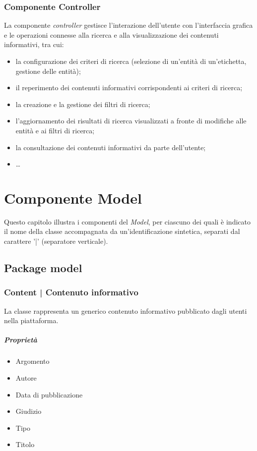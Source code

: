 \documentclass[10pt,a4paper,headinclude,footinclude,hidelinks]{scrreprt} %
\begin{document}
	\subsection{Componente Controller}
	\label{sec:stage:design:mvc:controller}
	La componente \textit{controller} gestisce l'interazione dell'utente con l'interfaccia grafica e le operazioni connesse alla ricerca e alla visualizzazione dei contenuti informativi, tra cui:
	\begin{itemize}
	\item la configurazione dei criteri di ricerca (selezione di un'entità di un'etichetta, gestione delle entità);
	\item il reperimento dei contenuti informativi corrispondenti ai criteri di ricerca;
	\item la creazione e la gestione dei filtri di ricerca;
	\item l'aggiornamento dei risultati di ricerca visualizzati a fronte di modifiche alle entità e ai filtri di ricerca;
	\item la consultazione dei contenuti informativi da parte dell'utente;
	\item \ldots
	\end{itemize}

	\chapter{Componente Model}
	\label{ch:stage:design:model}
	Questo capitolo illustra i componenti del \textit{Model}, per ciascuno dei quali è indicato il nome della classe accompagnata da un'identificazione sintetica, separati dal carattere '|' (separatore verticale).

	\section{Package model}
	\label{sec:stage:design:sistema:model}

	\subsection[Content]{Content | Contenuto informativo}
	\label{sec:stage:design:sistema:model:content}
	La classe rappresenta un generico contenuto informativo pubblicato dagli utenti nella piattaforma.

	\paragraph{Propriet\`a}
	\begin{itemize}
	\item Argomento
	\item Autore
	\item Data di pubblicazione
	\item Giudizio
	\item Tipo
	\item Titolo
	\end{itemize}
\end{document}
